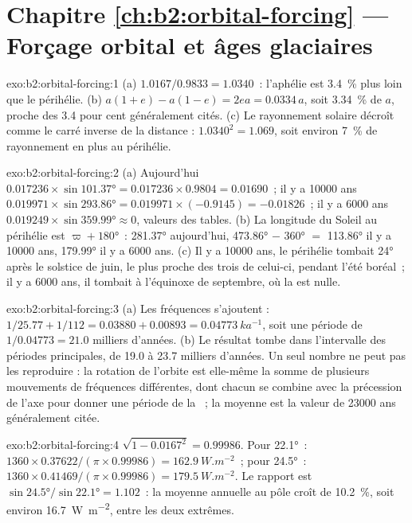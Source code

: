 \section*{Chapitre \ref{ch:b2:orbital-forcing} --- Forçage orbital et âges glaciaires}

\begin{solution}{exo:b2:orbital-forcing:1}
(a) $1.0167/0.9833 = 1.0340$~: l'aphélie est \qty{3.4}{\percent} plus loin que le périhélie.
(b) $a(1 + e) - a(1 - e) = 2ea = 0.0334\,a$, soit \qty{3.34}{\percent} de $a$, proche des 3.4 pour cent
généralement cités. (c) Le rayonnement solaire décroît comme le carré inverse de la distance : $1.0340^2 = 1.069$, soit
environ \qty{7}{\percent} de rayonnement en plus au périhélie.
\end{solution}

\begin{solution}{exo:b2:orbital-forcing:2}
(a) Aujourd'hui $0.017236 \times \sin\ang{101.37} = 0.017236 \times 0.9804 = 0.01690$~; il y a \num{10000} ans
$0.019971 \times \sin\ang{293.86} = 0.019971 \times (-0.9145) = -0.01826$~; il y a \num{6000} ans
$0.019249 \times \sin\ang{359.99} \approx 0$, valeurs des tables. (b) La longitude du Soleil au
périhélie est $\varpi + \ang{180}$~: \ang{281.37} aujourd'hui, \ang{473.86} $-$ \ang{360} $=$ \ang{113.86}
il y a \num{10000} ans, \ang{179.99} il y a \num{6000} ans. (c) Il y a \num{10000} ans, le périhélie
tombait \ang{24} après le solstice de juin, le plus proche des trois de celui-ci, pendant l'été boréal~;
il y a \num{6000} ans, il tombait à l'équinoxe de septembre, où la  est nulle.
\end{solution}

\begin{solution}{exo:b2:orbital-forcing:3}
(a) Les fréquences s'ajoutent : $1/25.77 + 1/112 = 0.03880 + 0.00893 = \qty{0.04773}{ka^{-1}}$, soit une période
de $1/0.04773 = 21.0$ milliers d'années. (b) Le résultat tombe dans l'intervalle des périodes principales,
de 19.0 à 23.7 milliers d'années. Un seul nombre ne peut pas les reproduire : la rotation de l'orbite
est elle-même la somme de plusieurs mouvements de fréquences différentes, dont chacun se combine avec la
précession de l'axe pour donner une période de la ~; la moyenne est la valeur de
\num{23000} ans généralement citée.
\end{solution}

\begin{solution}{exo:b2:orbital-forcing:4}
$\sqrt{1 - 0.0167^2} = 0.99986$. Pour \ang{22.1}~: $1360 \times 0.37622/(\pi \times 0.99986) =
\qty{162.9}{W.m^{-2}}$~; pour \ang{24.5}~: $1360 \times 0.41469/(\pi \times 0.99986) =
\qty{179.5}{W.m^{-2}}$. Le rapport est $\sin\ang{24.5}/\sin\ang{22.1} = 1.102$~: la moyenne annuelle au
pôle croît de \qty{10.2}{\percent}, soit environ \qty{16.7}{W.m^{-2}}, entre les deux extrêmes.
\end{solution}

